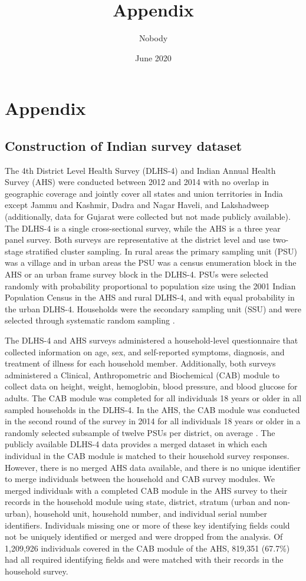 \documentclass[10pt,letterpaper]{article}
\title{Appendix} \author{Nobody}
\numberwithin{equation}{section}
\begin{document}
\date{June 2020}
\section{Appendix}
\subsection{Construction of Indian survey dataset}
The 4th District Level Health Survey (DLHS-4) and Indian Annual Health Survey (AHS) were conducted between 2012 and 2014 with no overlap in geographic coverage and jointly cover all states and union territories in India except Jammu and Kashmir, Dadra and Nagar Haveli, and Lakshadweep (additionally, data for Gujarat were collected but not made publicly available). The DLHS-4 is a single cross-sectional survey, while the AHS is a three year panel survey. Both surveys are representative at the district level and use two-stage stratified cluster sampling. In rural areas the primary sampling unit (PSU) was a village and in urban areas the PSU was a census enumeration block in the AHS or an urban frame survey block in the DLHS-4. PSUs were selected randomly with probability proportional to population size using the 2001 Indian Population Census in the AHS and rural DLHS-4, and with equal probability in the urban DLHS-4. Households were the secondary sampling unit (SSU) and were selected through systematic random sampling \cite{noauthor_annual_2014-1}.

The DLHS-4 and AHS surveys administered a household-level questionnaire that collected information on age, sex, and self-reported symptoms, diagnosis, and treatment of illness for each household member. Additionally, both surveys administered a Clinical, Anthropometric and Biochemical (CAB) module to collect data on height, weight, hemoglobin, blood pressure, and blood glucose for adults. The CAB module was completed for all individuals 18 years or older in all sampled households in the DLHS-4. In the AHS, the CAB module was conducted in the second round of the survey in 2014 for all individuals 18 years or older in a randomly selected subsample of twelve PSUs per district, on average \cite{noauthor_annual_2014}. The publicly available DLHS-4 data provides a merged dataset in which each individual in the CAB module is matched to their household survey responses. However, there is no merged AHS data available, and there is no unique identifier to merge individuals between the household and CAB survey modules. We merged individuals with a completed CAB module in the AHS survey to their records in the household module using state, district, stratum (urban and non-urban), household unit, household number, and individual serial number identifiers. Individuals missing one or more of these key identifying fields could not be uniquely identified or merged and were dropped from the analysis. Of 1,209,926 individuals covered in the CAB module of the AHS, 819,351 (\num{67.7}\%) had all required identifying fields and were matched with their records in the household survey.  
\end{document}
